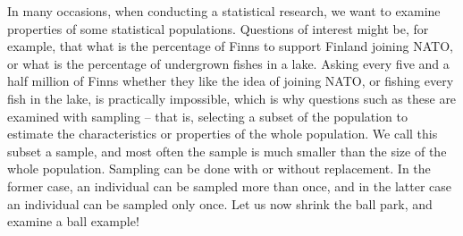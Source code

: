 \documentclass[12pt,a4paper,leqno]{report}
\theoremstyle{plain}
\theoremstyle{definition}
\begin{document}
In many occasions, when conducting a statistical research, we want to examine properties of some statistical populations. Questions of interest might be, for example, that what is the percentage of Finns to support Finland joining NATO, or what is the percentage of undergrown fishes in a lake. Asking every five and a half million of Finns whether they like the idea of joining NATO, or fishing every fish in the lake, is practically impossible, which is why questions such as these are examined with sampling -- that is, selecting a subset of the population to estimate the characteristics or properties of the whole population. We call this subset a sample, and most often the sample is much smaller than the size of the whole population. Sampling can be done with or without replacement. In the former case, an individual can be sampled more than once, and in the latter case an individual can be sampled only once. Let us now shrink the ball park, and examine a ball example!
\end{document}
